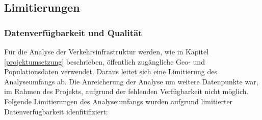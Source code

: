 


\subsection{Limitierungen}
\subsubsection{Datenverfügbarkeit und Qualität}
Für die Analyse der Verkehrsinfrastruktur werden, wie in Kapitel \ref{projektumsetzung} beschrieben, öffentlich zugängliche Geo- und Populationsdaten verwendet. Daraus leitet sich eine Limitierung des Analyseumfangs ab. Die Anreicherung der Analyse um weitere Datenpunkte war, im Rahmen des Projekts, aufgrund der fehlenden Verfügbarkeit nicht möglich. Folgende Limitierungen des Analyseumfangs wurden aufgrund limitierter Datenverfügbarkeit idenfitifiziert:

